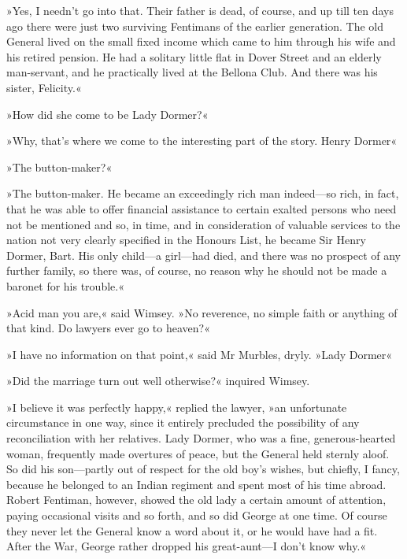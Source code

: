 »Yes, I needn't go into that. Their father is dead, of course, and up till ten days ago there were just two surviving Fentimans of the earlier generation. The old General lived on the small fixed income which came to him through his wife and his retired pension. He had a solitary little flat in Dover Street and an elderly man-servant, and he practically lived at the Bellona Club. And there was his sister, Felicity.«

»How did she come to be Lady Dormer?«

»Why, that's where we come to the interesting part of the story. Henry Dormer\longdash«

»The button-maker?«

»The button-maker. He became an exceedingly rich man indeed\allowbreak---\allowbreak so rich, in fact, that he was able to offer financial assistance to certain exalted persons who need not be mentioned and so, in time, and in consideration of valuable services to the nation not very clearly specified in the Honours List, he became Sir Henry Dormer, Bart. His only child\allowbreak---\allowbreak a girl\allowbreak---\allowbreak had died, and there was no prospect of any further family, so there was, of course, no reason why he should not be made a baronet for his trouble.«

»Acid man you are,« said Wimsey. »No reverence, no simple faith or anything of that kind. Do lawyers ever go to heaven?«

»I have no information on that point,« said Mr Murbles, dryly. »Lady Dormer\longdash«

»Did the marriage turn out well otherwise?« inquired Wimsey.

»I believe it was perfectly happy,« replied the lawyer, »an unfortunate circumstance in one way, since it entirely precluded the possibility of any reconciliation with her relatives. Lady Dormer, who was a fine, generous-hearted woman, frequently made overtures of peace, but the General held sternly aloof. So did his son\allowbreak---\allowbreak partly out of respect for the old boy's wishes, but chiefly, I fancy, because he belonged to an Indian regiment and spent most of his time abroad. Robert Fentiman, however, showed the old lady a certain amount of attention, paying occasional visits and so forth, and so did George at one time. Of course they never let the General know a word about it, or he would have had a fit. After the War, George rather dropped his great-aunt\allowbreak---\allowbreak I don't know why.«

